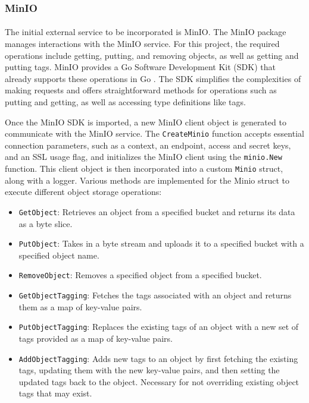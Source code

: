 \documentclass[12pt, conference, final, a4paper, onecolumn, compsoc]{IEEEtran}
\begin{document}
\subsubsection*{MinIO}
\paragraph{}

The initial external service to be incorporated is MinIO. The MinIO package
manages interactions with the MinIO service. For this project, the required
operations include getting, putting, and removing objects, as well as getting
and putting tags. MinIO provides a Go Software Development Kit (SDK) that
already supports these operations in Go \citep{minio-go-repo}. The SDK
simplifies the complexities of making requests and offers straightforward
methods for operations such as putting and getting, as well as accessing type
definitions like tags.

Once the MinIO SDK is imported, a new MinIO client object is generated to
communicate with the MinIO service. The \texttt{CreateMinio} function accepts
essential connection parameters, such as a context, an endpoint, access and
secret keys, and an SSL usage flag, and initializes the MinIO client using the
\texttt{minio.New} function. This client object is then incorporated into a
custom \texttt{Minio} struct, along with a logger. Various methods are
implemented for the Minio struct to execute different object storage operations:

\begin{itemize}
  \item \texttt{GetObject}: Retrieves an object from a specified bucket and
        returns its data as a byte slice.
  \item \texttt{PutObject}: Takes in a byte stream and uploads it to a specified
        bucket with a specified object name.
  \item \texttt{RemoveObject}: Removes a specified object from a specified
        bucket.
  \item \texttt{GetObjectTagging}: Fetches the tags associated with an object
        and returns them as a map of key-value pairs.
  \item \texttt{PutObjectTagging}: Replaces the existing tags of an object with
        a new set of tags provided as a map of key-value pairs.
  \item \texttt{AddObjectTagging}: Adds new tags to an object by first fetching
        the existing tags, updating them with the new key-value pairs, and then
        setting the updated tags back to the object. Necessary for not
        overriding existing object tags that may exist.
\end{itemize}
\end{document}
